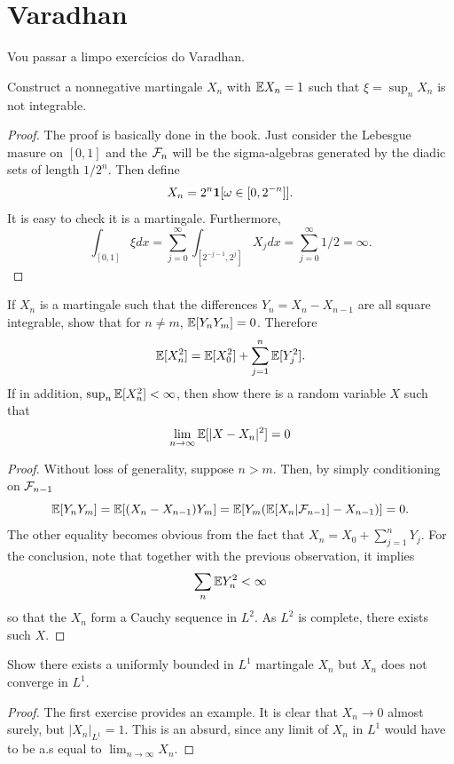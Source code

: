 \section{Varadhan}
Vou passar a limpo exercícios do Varadhan.
\begin{exercise}[5.1]
	Construct a nonnegative martingale $X_n$ with $\mathbb{E} X_n = 1$ such that
	$\xi = \sup_n X_n$ is not integrable.
\end{exercise}
\begin{proof}
	The proof is basically done in the book. Just consider the
	Lebesgue masure on $[0,1]$ and the $\mathcal{F}_n$ will be the sigma-algebras
	generated by the diadic sets of length $1/2^n$. Then define
	\[
		X_n = 2^n\bm{1}[\omega \in [0,2^{-n}]].
	\]
	It is easy to check it is a martingale. Furthermore,
	\[
		\int_{[0,1]} \xi dx = \sum_{j = 0}^{\infty} \int_{[2^{-j - 1},
		2^{j}]} X_j dx = \sum_{j = 0}^{\infty} 1/2 = \infty.
	\]
\end{proof}

\begin{exercise}[5.2]
	If $X_n$ is a martingale such that the differences $Y_n = X_{n} -
	X_{n-1}$ are all
	square integrable, show that for $n \neq m$, $\mathbb{E}[Y_n Y_m] = 0$. Therefore
	\[
		\mathbb{E}[X_n^2] = \mathbb{E}[X_0^2] + \sum_{j=1}^n \mathbb{E}[Y_j^2].
	\]
	If in addition, $\sup_n \mathbb{E}[X_n^2] < \infty$, then show there is a
	random variable $X$ such that
	\[
		\lim_{n \rightarrow \infty} \mathbb{E}[|X - X_n|^2] = 0
	\]
\end{exercise}

\begin{proof}
	Without loss of generality, suppose $n > m$. Then, by simply
	conditioning on $\mathcal{F}_{n-1}$
	\[
		\mathbb{E}[Y_n Y_m] = \mathbb{E}[(X_n - X_{n-1})Y_m] = \mathbb{E}[Y_m
		(\mathbb{E}[X_n|\mathcal{F}_{n-1}] - X_{n-1})] = 0.
	\]
	The other equality becomes obvious from the fact that $X_n = X_0 +
	\sum_{j=1}^n Y_j$.
	For the conclusion, note that together with the previous
	observation, it implies
	\[
		\sum_n \mathbb{E} Y_n^2 < \infty
	\]
	so that the $X_n$ form a Cauchy sequence in $L^2$. As $L^2$ is
	complete, there exists
	such $X$.
\end{proof}

\begin{exercise}[5.3]
	Show there exists a uniformly bounded in $L^1$ martingale $X_n$ but $X_n$ does
	not converge in $L^1$.
\end{exercise}
\begin{proof}
	The first exercise provides an example. It is clear that $X_n \to
	0$ almost surely,
	but $|X_n|_{L^1} = 1$. This is an absurd, since any limit of $X_n$
	in $L^1$ would have
	to be a.s equal to $\lim_{n\to\infty} X_n$.
\end{proof}

